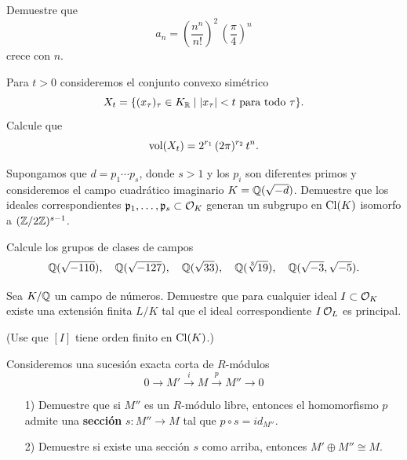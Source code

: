 \begin{ejercicio}
  Demuestre que
  $$a_n = \left(\frac{n^n}{n!}\right)^2\,\left(\frac{\pi}{4}\right)^n$$
  crece con $n$.
\end{ejercicio}

\begin{ejercicio}
  Para $t > 0$ consideremos el conjunto convexo simétrico
  $$X_t = \{ (x_\tau)_\tau \in K_{\mathbb{R}} \mid |x_\tau| < t\text{ para todo }\tau \}.$$
  Calcule que
  $$\operatorname{vol} (X_t) = 2^{r_1}\,(2\pi)^{r_2}\,t^n.$$
\end{ejercicio}

\begin{ejercicio}
  Supongamos que $d = p_1\cdots p_s$, donde $s > 1$ y los $p_i$ son diferentes
  primos y consideremos el campo cuadrático imaginario $K = \mathbb{Q} (\sqrt{-d})$.
  Demuestre que los ideales correspondientes
  $\mathfrak{p}_1,\ldots,\mathfrak{p}_s \subset \mathcal{O}_K$ generan un subgrupo en
  $\operatorname{Cl} (K)$ isomorfo a $(\mathbb{Z}/2\mathbb{Z})^{s-1}$.
\end{ejercicio}

\begin{ejercicio}
  Calcule los grupos de clases de campos
  \[ \mathbb{Q} (\sqrt{-110}), \quad
     \mathbb{Q} (\sqrt{-127}), \quad
     \mathbb{Q} (\sqrt{33}), \quad
     \mathbb{Q} (\sqrt[3]{19}), \quad
     \mathbb{Q} (\sqrt{-3}, \sqrt{-5}). \]
\end{ejercicio}

\begin{ejercicio}
  Sea $K/\mathbb{Q}$ un campo de números. Demuestre que para cualquier ideal
  $I \subset \mathcal{O}_K$ existe una extensión finita $L/K$ tal que el ideal
  correspondiente $I\,\mathcal{O}_L$ es principal.

  \noindent (Use que $[I]$ tiene orden finito en $\operatorname{Cl} (K)$.)
\end{ejercicio}

\begin{ejercicio}
  \label{ejerc:seccion-de-sec}
  Consideremos una sucesión exacta corta de $R$-módulos
  $$0 \to M' \xrightarrow{i} M \xrightarrow{p} M'' \to 0$$

  \begin{enumerate}
  \item[1)] Demuestre que si $M''$ es un $R$-módulo libre, entonces
    el homomorfismo $p$ admite una \textbf{sección} $s\colon M'' \to M$
    tal que $p\circ s = id_{M''}$.

  \item[2)] Demuestre si existe una sección $s$ como arriba, entonces
    $M'\oplus M'' \cong M$.
  \end{enumerate}
\end{ejercicio}

